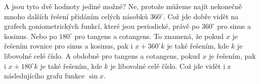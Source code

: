 \documentclass[12pt,a4paper]{article}
\begin{document}
\begin{center}
\end{center}

A jsou tyto dvě hodnoty jediné možné?
Ne, protože můžeme najít nekonečně mnoho dalších řešení přidáním celých násobků $360^\circ$.
Což jde dobře vidět na grafech goniometrických funkcí, které jsou periodické, právě po $360^\circ$ pro sinus a kosinus.
Nebo po $180^\circ$ pro tangens a cotangens.
To znamená, že pokud $x$ je řešením rovnice pro sinus a kosinus, pak i $x + 360^\circ k$ je také řešením, kde $k$ je libovolné celé číslo.
A obdobně pro tangens a cotangens, pokud $x$ je řešením, pak i $x + 180^\circ k$ je také řešením, kde $k$ je libovolné celé číslo.
Což jde vidět i z následujícího grafu funkce $\sin x$.
\end{document}
